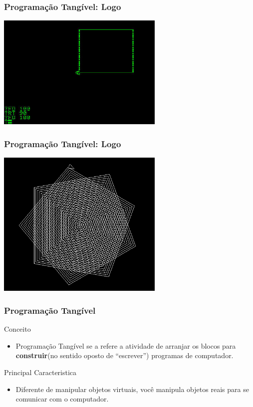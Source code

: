 \documentclass{beamer}
\begin{document}
 
\begin{frame}
  \frametitle{Programação Tangível: Logo}
  \begin{center}
    \includegraphics[width=8cm]{imagens/logo1.jpg}
    \end{center}
\end{frame}

\begin{frame}
  \frametitle{Programação Tangível: Logo}
  \begin{center}
    \includegraphics[width=8cm]{imagens/logo2.png}
  \end{center}
\end{frame}


\begin{frame}
  \frametitle{Programação Tangível}
  \begin{block}{Conceito}
    \begin{itemize}
    \item Programação Tangível se a refere a atividade de arranjar os blocos para \textbf{construir}(no sentido oposto de ``escrever'') programas de computador. ~\cite{McNerney2000}
    \end{itemize}
  \end{block}
  
  \begin{block}{Principal Caracteristica}
    \begin{itemize}
    \item Diferente de manipular objetos virtuais, você manipula objetos reais para se comunicar com o computador.
    \end{itemize}
    \end{block}  
\end{frame}
\end{document}
